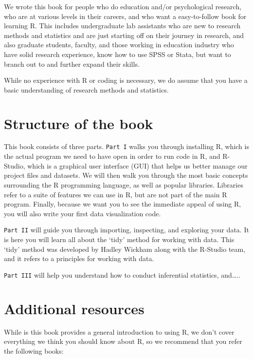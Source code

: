 \documentclass[
]{book}
\begin{document}
We wrote this book for people who do education and/or psychological research, who are at various levels in their careers, and who want a easy-to-follow book for learning R. This includes undergraduate lab assistants who are new to research methods and statistics and are just starting off on their journey in research, and also graduate students, faculty, and those working in education industry who have solid research experience, know how to use SPSS or Stata, but want to branch out to and further expand their skills.

While no experience with R or coding is necessary, we do assume that you have a basic understanding of research methods and statistics.

\hypertarget{structure-of-the-book}{%
\section{Structure of the book}\label{structure-of-the-book}}

This book consists of three parts. \texttt{Part\ I} walks you through installing R, which is the actual program we need to have open in order to run code in R, and R-Studio, which is a graphical user interface (GUI) that helps us better manage our project files and datasets. We will then walk you through the most basic concepts surrounding the R programming language, as well as popular libraries. Libraries refer to a suite of features we can use in R, but are not part of the main R program. Finally, because we want you to see the immediate appeal of using R, you will also write your first data visualization code.

\texttt{Part\ II} will guide you through importing, inspecting, and exploring your data. It is here you will learn all about the `tidy' method for working with data. This `tidy' method was developed by Hadley Wickham along with the R-Studio team, and it refers to a principles for working with data.

\texttt{Part\ III} will help you understand how to conduct inferential statistics, and\ldots..

\hypertarget{additional-resources}{%
\section{Additional resources}\label{additional-resources}}

While is this book provides a general introduction to using R, we don't cover everything we think you should know about R, so we recommend that you refer the following books:
\end{document}

